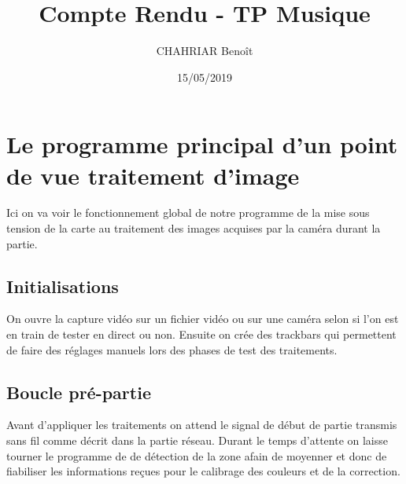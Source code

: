 \documentclass{article}
\title{Compte Rendu - TP Musique}
\author{
CHAHRIAR Benoît}
\date{15/05/2019}
\begin{document}
\maketitle

\section{Le programme principal d'un point de vue traitement d'image}

	Ici on va voir le fonctionnement global de notre programme de la mise sous tension de la carte au traitement des images acquises par la caméra durant la partie.

	\subsection{Initialisations}

		On ouvre la capture vidéo sur un fichier vidéo ou sur une caméra selon si l'on est en train de tester en direct ou non. Ensuite on crée des trackbars qui permettent de faire des réglages manuels lors des phases de test des traitements.

	\subsection{Boucle pré-partie}

		Avant d'appliquer les traitements on attend le signal de début de partie transmis sans fil comme décrit dans la partie réseau. Durant le temps d'attente on laisse tourner le programme de de détection de la zone afain de moyenner et donc de fiabiliser les informations reçues pour le calibrage des couleurs et de la correction.
\end{document}
